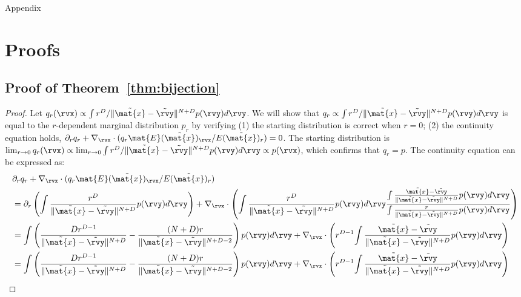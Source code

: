 \newpage
\onecolumn
{\huge Appendix}


\def\E{{\bf E}}
\def\x{{\bf x}}
\def\r{{\bf r}}
\def\rhat{\hat{r}}

\section{Proofs}

\label{app:proofs}

\subsection{Proof of Theorem~\ref{thm:bijection}}
\label{app:proof-bij}
\thmbij*
\begin{proof}
Let $q_r(\rvx) \propto \int {r^D}/{\|\tilde{\mat{x}}-\tilde{\rvy}\|^{N+D}}p(\rvy)d\rvy$. We will show that $q_r\propto \int {r^D}/{\|\tilde{\mat{x}}-\tilde{\rvy}\|^{N+D}}p(\rvy)d\rvy$ is equal to the $r$-dependent marginal distribution $p_r$ by verifying (1) the starting distribution is correct when $r{=}0$; (2) the continuity equation holds, \ie $\partial_r q_r + \nabla_\rvx\cdot(q_r \mat{E}(\tilde{\mat{x}})_\rvx  /E(\tilde{\mat{x}})_{r})=0$. The starting distribution is $\lim_{r\to 0}q_r(\rvx) \propto \lim_{r\to 0}\int {r^D}/{\|\tilde{\mat{x}}-\tilde{\rvy}\|^{N+D}}p(\rvy)d\rvy\propto p(\rvx)$, which confirms that $q_r{=}p$. The continuity equation can be expressed as:
\begin{align*}
    &\partial_r q_r + \nabla_\rvx\cdot(q_r \mat{E}(\tilde{\mat{x}})_\rvx/E(\tilde{\mat{x}})_{r})\\
    &=  \partial_r\left(\int \frac{r^D}{\|\tilde{\mat{x}}-\tilde{\rvy}\|^{N+D}}p(\rvy)d\rvy\right)+ \nabla_\rvx\cdot\left(\int \frac{r^D}{\|\tilde{\mat{x}}-\tilde{\rvy}\|^{N+D}}{p}({\rvy}) d {\rvy}\frac{\int \frac{\tilde{\mat{x}}-\tilde{\rvy}}{\|\tilde{\mat{x}}-\tilde{\rvy}\|^{N+D}}{p}({\rvy}) d {\rvy}}{\int \frac{r}{\|\tilde{\mat{x}}-\tilde{\rvy}\|^{N+D}}{p}({\rvy}) d {\rvy}}\right)\\
    &=  \int \left(\frac{Dr^{D-1}}{{\|\tilde{\mat{x}}-\tilde{\rvy}\|^{N+D}}} - \frac{(N+D)r}{{\|\tilde{\mat{x}}-\tilde{\rvy}\|^{N+D-2}}}\right)p(\rvy)d\rvy+\nabla_\rvx\cdot\left(r^{D-1}{\int \frac{\tilde{\mat{x}}-\tilde{\rvy}}{\|\tilde{\mat{x}}-\tilde{\rvy}\|^{N+D}}{p}({\rvy}) d {\rvy}}\right)\\
    &=  \int \left(\frac{Dr^{D-1}}{{\|\tilde{\mat{x}}-\tilde{\rvy}\|^{N+D}}} - \frac{(N+D)r}{{\|\tilde{\mat{x}}-\tilde{\rvy}\|^{N+D-2}}}\right)p(\rvy)d\rvy+\nabla_\rvx\cdot\left(r^{D-1}{\int \frac{\tilde{\mat{x}}-\tilde{\rvy}}{\|\tilde{\mat{x}}-\tilde{\rvy}\|^{N+D}}{p}({\rvy}) d {\rvy}}\right)\\

\end{align*}
\end{proof}
